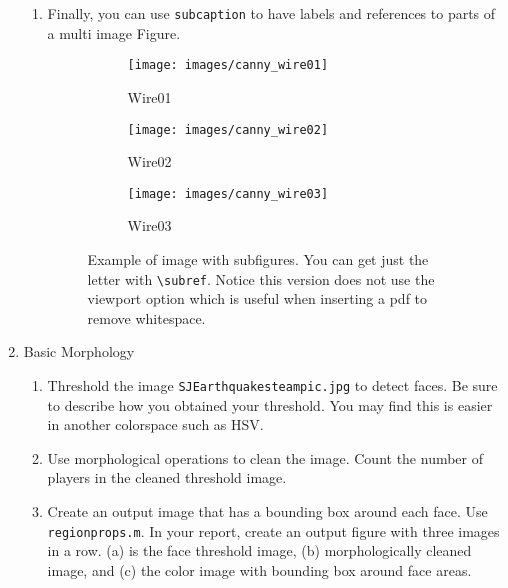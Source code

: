 \documentclass[letterpaper,11pt]{article}
\begin{document}
\begin{enumerate}
\begin{enumerate}
\item Finally, you can use \texttt{subcaption} to have labels and references to parts of a multi image Figure. 

\begin{figure}
    \centering
    \begin{subfigure}[b]{0.32\linewidth}
        \texttt{[image: images/canny\_wire01]}
        \caption{Wire01}
        \label{fig:wire01}
    \end{subfigure}
    \begin{subfigure}[b]{0.32\linewidth}
        \texttt{[image: images/canny\_wire02]}
        \caption{Wire02}
        \label{fig:wire02}
    \end{subfigure}
    \begin{subfigure}[b]{0.3\linewidth}
        \texttt{[image: images/canny\_wire03]}
        \caption{Wire03}
        \label{fig:wire03}
    \end{subfigure}
    \caption{Example of image with subfigures.  You can get just the letter with \texttt{{\textbackslash}subref}.  Notice this version does not use the viewport option which is useful when inserting a pdf to remove whitespace.}
    \label{fig:subfig}
\end{figure}


\end{enumerate}

\item Basic Morphology

\begin{enumerate}

\item Threshold the image \texttt{SJEarthquakesteampic.jpg} to detect faces.  Be sure to describe how you obtained your threshold.  You may find this is easier in another colorspace such as HSV.

\item Use morphological operations to clean the image.  Count the number of players in the cleaned threshold image.  

\item Create an output image that has a bounding box around each face.  Use \texttt{regionprops.m}.  In your report, create an output figure with three images in a row.  (a) is the face threshold image, (b) morphologically cleaned image, and (c) the color image with bounding box around face areas.


\end{enumerate}
\end{enumerate}
\end{document}
